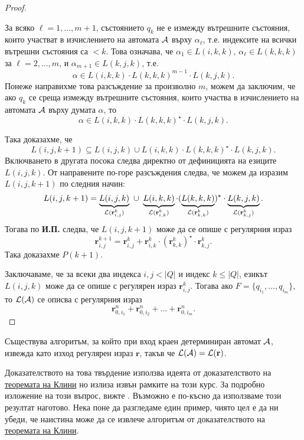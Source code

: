 \begin{proof}
\begin{enumerate}[a)]
\begin{itemize}
      За всяко $\ell=1,\dots,m+1$, състоянието $q_k$ не е измежду вътрешните състояния, които участват в изчислението на автомата $\mathcal{A}$ върху $\alpha_\ell$, т.е. индексите на всички вътрешни състояния са $<k$.
      Това означава, че $\alpha_1 \in L(i,k,k)$, $\alpha_\ell \in L(k,k,k)$ за $\ell=2,\dots,m$, и $\alpha_{m+1} \in L(k,j,k)$, т.е.
      \[\alpha \in L(i,k,k) \cdot L(k,k,k)^{m-1} \cdot L(k,j,k).\]
      Понеже направихме това разсъждение за произволно $m$,
      можем да заключим, че ако $q_k$ се среща измежду вътрешните състояния, които участва в изчислението на автомата $\mathcal{A}$ върху думата $\alpha$,
      то \[\alpha \in L(i,k,k) \cdot L(k,k,k)^\star \cdot L(k,j,k).\]
    \end{itemize}
    Така доказахме, че 
    \[L(i,j,k+1) \subseteq L(i,j,k) \cup L(i,k,k) \cdot L(k,k,k)^\star \cdot L(k,j,k).\]
    Включването в другата посока следва директно от дефиницията на езиците $L(i,j,k)$.
    От направените по-горе разсъждения следва, че можем да изразим $L(i,j,k+1)$ по следния начин:
    \[L(i,j,k+1) = \underbrace{L(i,j,k)}_{\L(\mathbf{r}^{k}_{i,j})}\ \cup\ \underbrace{L(i,k,k)}_{\L(\mathbf{r}^{k}_{i,k})}\cdot (\underbrace{L(k,k,k)}_{\L(\mathbf{r}^{k}_{k,k})})^\star \cdot \underbrace{L(k,j,k)}_{\L(\mathbf{r}^{k}_{k,j})}.\]
    Тогава по {\bf И.П.} следва, че $L(i,j,k+1)$ може да се опише с регулярния израз
    \begin{equation}
      \label{eq:kleene}
      \mathbf{r}^{k+1}_{i,j} = \mathbf{r}^{k}_{i,j} + \mathbf{r}^{k}_{i,k}\cdot (\mathbf{r}^{k}_{k,k})^\star\cdot \mathbf{r}^{k}_{k,j}.
    \end{equation}
    Така доказахме $P(k+1)$.
  \end{enumerate}
  Заключаваме, че за всеки два индекса $i,j < |Q|$ и индекс $k \leq |Q|$, езикът $L(i,j,k)$ може да се опише с регулярен израз $\mathbf{r}^{k}_{i,j}$.
  Тогава ако $F = \{q_{i_1},\dots,q_{i_m}\}$, то $\mathcal{L}(\mathcal{A})$ се описва с регулярния израз
  \[\mathbf{r}^n_{0,i_1} + \mathbf{r}^n_{0,i_2} + \dots + \mathbf{r}^n_{0,i_m}.\]
\end{proof}

\begin{proposition}
  Съществува алгоритъм, за който при вход краен детерминиран автомат $\mathcal{A}$,
  извежда като изход регулярен израз $\mathbf{r}$, такъв че $\mathcal{L}(\mathcal{A}) = \mathcal{L}(\mathbf{r})$.
\end{proposition}

Доказателството на това твърдение използва идеята от доказателството на \hyperref[th:regular:kleene]{теоремата на Клини}
но излиза извън рамките на този курс. За подробно изложение на този въпрос, вижте \cite[стр. 69]{sipser3}.
Възможно е по-късно да използваме този резултат наготово.
Нека поне да разгледаме един пример, чиято цел е да ни убеди, 
че наистина може да се извлече алгоритъм от доказателството на \hyperref[th:regular:kleene]{теоремата на Клини}.


